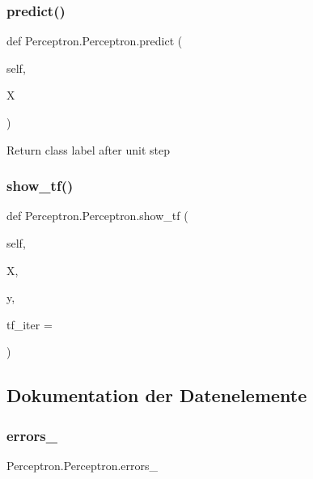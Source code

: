 \subsubsection{\texorpdfstring{predict()}{predict()}}
{\footnotesize\ttfamily def Perceptron.\+Perceptron.\+predict (\begin{DoxyParamCaption}\item[{}]{self,  }\item[{}]{X }\end{DoxyParamCaption})}

\begin{DoxyVerb}Return class label after unit step\end{DoxyVerb}
 \mbox{\label{class_perceptron_1_1_perceptron_a5d312133ac49a2238ef5f06dc0917592}} 
\subsubsection{\texorpdfstring{show\+\_\+tf()}{show\_tf()}}
{\footnotesize\ttfamily def Perceptron.\+Perceptron.\+show\+\_\+tf (\begin{DoxyParamCaption}\item[{}]{self,  }\item[{}]{X,  }\item[{}]{y,  }\item[{}]{tf\+\_\+iter = {} }\end{DoxyParamCaption})}



\subsection{Dokumentation der Datenelemente}
\mbox{\label{class_perceptron_1_1_perceptron_af304ae57628fdf47e1d2fec6cc5f5417}} 
\subsubsection{\texorpdfstring{errors\+\_\+}{errors\_}}
{\footnotesize\ttfamily Perceptron.\+Perceptron.\+errors\+\_\+}

